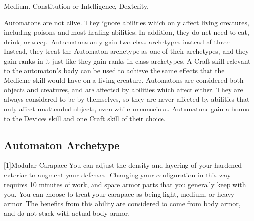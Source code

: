      Medium.
      Constitution or Intelligence,  Dexterity.
    \begin{itemize}
         Automatons are not alive. They ignore abilities which only affect living creatures, including poisons and most healing abilities. In addition, they do not need to eat, drink, or sleep.
         Automatons only gain two class archetypes instead of three.
            Instead, they treat the Automaton archetype as one of their archetypes, and they gain ranks in it just like they gain ranks in class archetypes.
         A Craft skill relevant to the automaton's body can be used to achieve the same effects that the Medicine skill would have on a living creature.
         Automatons are considered both objects and creatures, and are affected by abilities which affect either.
            They are always considered to be  by themselves, so they are never affected by abilities that only affect unattended objects, even while unconscious.
         Automatons gain a  bonus to the Devices skill and one Craft skill of their choice.
    \end{itemize}

    \subsection{Automaton Archetype}

        [1]{Modular Carapace} You can adjust the density and layering of your hardened exterior to augment your defenses.
        Changing your configuration in this way requires 10 minutes of work, and spare armor parts that you generally keep with you.
        You can choose to treat your carapace as being light, medium, or heavy armor.
        The benefits from this ability are considered to come from body armor, and do not stack with actual body armor.

